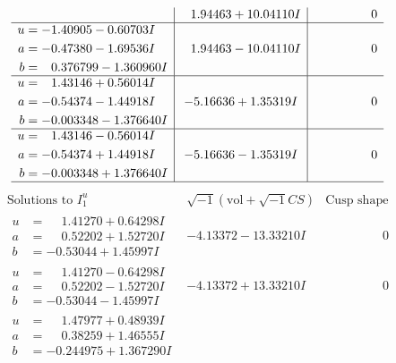 \documentclass[1p]{elsarticle_modified}
\theoremstyle{definition}
\newcommand{\I}{\sqrt{-1}}
\begin{document}
$$\begin{array}{c|c|c}
 & \phantom{-}1.94463 + 10.04110 I & \phantom{-0.000000 } 0 \\ \hline\begin{aligned}
u &= -1.40905 - 0.60703 I \\
a &= -0.47380 - 1.69536 I \\
b &= \phantom{-}0.376799 - 1.360960 I\end{aligned}
 & \phantom{-}1.94463 - 10.04110 I & \phantom{-0.000000 } 0 \\ \hline\begin{aligned}
u &= \phantom{-}1.43146 + 0.56014 I \\
a &= -0.54374 - 1.44918 I \\
b &= -0.003348 - 1.376640 I\end{aligned}
 & -5.16636 + 1.35319 I & \phantom{-0.000000 } 0 \\ \hline\begin{aligned}
u &= \phantom{-}1.43146 - 0.56014 I \\
a &= -0.54374 + 1.44918 I \\
b &= -0.003348 + 1.376640 I\end{aligned}
 & -5.16636 - 1.35319 I & \phantom{-0.000000 } 0\\
 \hline 
 \end{array}$$\newpage$$\begin{array}{c|c|c}  
\text{Solutions to }I^u_{1}& \I (\text{vol} + \sqrt{-1}CS) & \text{Cusp shape}\\
 \hline 
\begin{aligned}
u &= \phantom{-}1.41270 + 0.64298 I \\
a &= \phantom{-}0.52202 + 1.52720 I \\
b &= -0.53044 + 1.45997 I\end{aligned}
 & -4.13372 - 13.33210 I & \phantom{-0.000000 } 0 \\ \hline\begin{aligned}
u &= \phantom{-}1.41270 - 0.64298 I \\
a &= \phantom{-}0.52202 - 1.52720 I \\
b &= -0.53044 - 1.45997 I\end{aligned}
 & -4.13372 + 13.33210 I & \phantom{-0.000000 } 0 \\ \hline\begin{aligned}
u &= \phantom{-}1.47977 + 0.48939 I \\
a &= \phantom{-}0.38259 + 1.46555 I \\
b &= -0.244975 + 1.367290 I\end{aligned}

\end{array}$$
\end{document}
